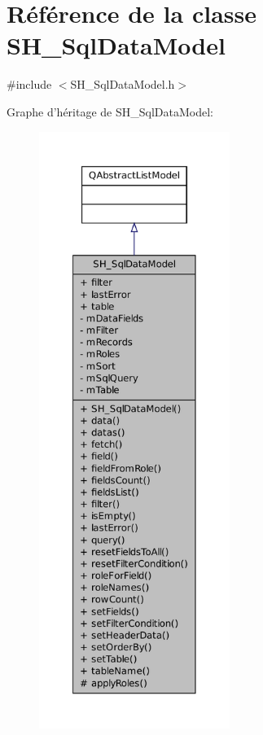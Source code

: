 \hypertarget{classSH__SqlDataModel}{\section{Référence de la classe S\-H\-\_\-\-Sql\-Data\-Model}
\label{classSH__SqlDataModel}
}


{\ttfamily \#include $<$S\-H\-\_\-\-Sql\-Data\-Model.\-h$>$}



Graphe d'héritage de S\-H\-\_\-\-Sql\-Data\-Model\-:
\nopagebreak
\begin{figure}[H]
\begin{center}
\leavevmode
\includegraphics[height=550pt]{classSH__SqlDataModel__inherit__graph}
\end{center}
\end{figure}



